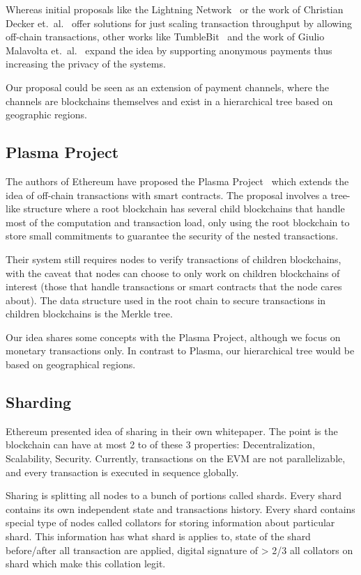 Whereas initial proposals like the Lightning Network~\cite{light} or the work of
Christian Decker et.\ al.~\cite{chan1} offer solutions for just scaling
transaction throughput by allowing off-chain transactions, other works like
TumbleBit~\cite{tumble} and the work of Giulio Malavolta et.\ al.~\cite{chan2}
expand the idea by supporting anonymous payments thus increasing the privacy of
the systems.

Our proposal could be seen as an extension of payment channels, where the
channels are blockchains themselves and exist in a hierarchical tree based on
geographic regions.

\subsection{Plasma Project}

The authors of Ethereum have proposed the Plasma Project~\cite{plasma} which
extends the idea of off-chain transactions with smart contracts.  The proposal
involves a tree-like structure where a root blockchain has several child
blockchains that handle most of the computation and transaction load, only
using the root blockchain to store small commitments to guarantee the security
of the nested transactions.

Their system still requires nodes to verify transactions of children
blockchains, with the caveat that nodes can choose to only work on children
blockchains of interest (those that handle transactions or smart contracts that
the node cares about).  The data structure used in the root chain to secure
transactions in children blockchains is the Merkle tree.

Our idea shares some concepts with the Plasma Project, although we focus on
monetary transactions only.  In contrast to Plasma, our hierarchical tree would
be based on geographical regions.

\subsection{Sharding}

Ethereum presented idea of sharing in their own whitepaper. The point is the
blockchain can have at most 2 to of these 3 properties: Decentralization,
Scalability, Security. Currently, transactions on the EVM are not
parallelizable, and every transaction is executed in sequence globally.

Sharing is splitting all nodes to a bunch of portions called shards. Every
shard contains its own independent state and transactions history. Every shard
contains special type of nodes called collators for storing information about
particular shard. This information has what shard is applies to, state of the
shard before/after all transaction are applied, digital signature of > 2/3 all
collators on shard which make this collation legit.

